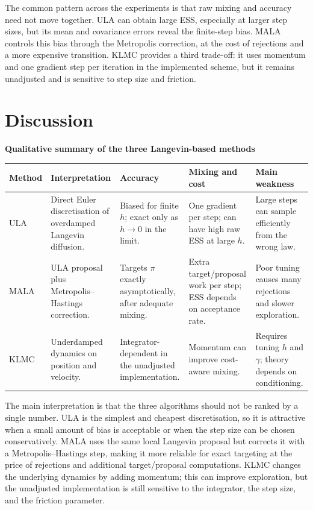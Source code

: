 \documentclass[a4paper,11pt, titlepage]{article}
\theoremstyle{definition}
\theoremstyle{plain}
\theoremstyle{remark}
\begin{document}

The common pattern across the experiments is that raw mixing and accuracy need not move together. ULA can obtain large ESS, especially at larger step sizes, but its mean and covariance errors reveal the finite-step bias. MALA controls this bias through the Metropolis correction, at the cost of rejections and a more expensive transition. KLMC provides a third trade-off: it uses momentum and one gradient step per iteration in the implemented scheme, but it remains unadjusted and is sensitive to step size and friction.

\section{Discussion}

\begin{center}
\textbf{Qualitative summary of the three Langevin-based methods}

\centering
\small
\begin{tabular}{p{}p{}p{}p{}p{}}
\toprule
Method & Interpretation & Accuracy & Mixing and cost & Main weakness \\
\midrule
ULA & Direct Euler discretisation of overdamped Langevin diffusion. &
Biased for finite $h$; exact only as $h\to0$ in the limit. &
One gradient per step; can have high raw ESS at large $h$. &
Large steps can sample efficiently from the wrong law. \\
MALA & ULA proposal plus Metropolis--Hastings correction. &
Targets $\pi$ exactly asymptotically, after adequate mixing. &
Extra target/proposal work per step; ESS depends on acceptance rate. &
Poor tuning causes many rejections and slower exploration. \\
KLMC & Underdamped dynamics on position and velocity. &
Integrator-dependent in the unadjusted implementation. &
Momentum can improve cost-aware mixing. &
Requires tuning $h$ and $\gamma$; theory depends on conditioning. \\
\bottomrule
\end{tabular}
\end{center}

The main interpretation is that the three algorithms should not be ranked by a single number. ULA is the simplest and cheapest discretisation, so it is attractive when a small amount of bias is acceptable or when the step size can be chosen conservatively. MALA uses the same local Langevin proposal but corrects it with a Metropolis--Hastings step, making it more reliable for exact targeting at the price of rejections and additional target/proposal computations. KLMC changes the underlying dynamics by adding momentum; this can improve exploration, but the unadjusted implementation is still sensitive to the integrator, the step size, and the friction parameter.
\end{document}
